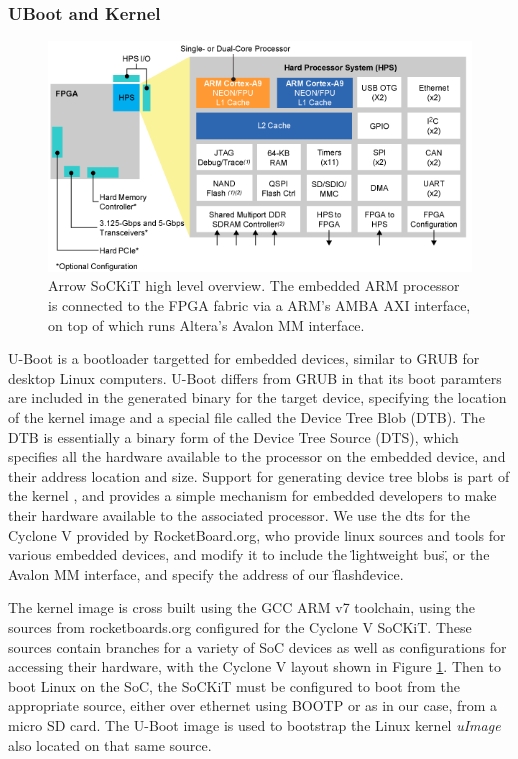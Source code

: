 \documentclass{sig-alternate-10pt}
\begin{document}
\subsubsection{UBoot and Kernel}
\begin{figure}
	\begin{center}
		\includegraphics[width=0.9\linewidth]{fig/soc_cyclonev.png}
		\caption{
			Arrow SoCKiT high level overview. The embedded ARM processor is connected to the FPGA fabric via a ARM's AMBA AXI interface, on top of which runs Altera's Avalon MM interface.
		}
		\label{fig:cyclone_diag}
	\end{center}
\end{figure}

U-Boot is a bootloader targetted for embedded devices, similar to GRUB for desktop Linux computers. U-Boot differs from GRUB in that its boot paramters are included in the generated binary for the target device, specifying the location of the kernel image and a special file called the Device Tree Blob (DTB). The DTB is essentially a binary form of the Device Tree Source (DTS), which specifies all the hardware available to the processor on the embedded device, and their address location and size. Support for generating device tree blobs is part of the kernel \cite{dts_linux}, and provides a simple mechanism for embedded developers to make their hardware available to the associated processor. We use the dts for the Cyclone V provided by RocketBoard.org, who provide linux sources and tools for various embedded devices, and modify it to include the \"lightweight bus\", or the Avalon MM interface, and specify the address of our \"flash\" device.

The kernel image is cross built using the GCC ARM v7 toolchain, using the sources from rocketboards.org configured for the Cyclone V SoCKiT. These sources contain branches for a variety of SoC devices as well as configurations for accessing their hardware, with the Cyclone V layout shown in Figure \ref{fig:cyclone_diag}. Then to boot Linux on the SoC, the SoCKiT must be configured to boot from the appropriate source, either over ethernet using BOOTP or as in our case, from a micro SD card. The U-Boot image is used to bootstrap the Linux kernel \emph{uImage} also located on that same source. 
\end{document}
